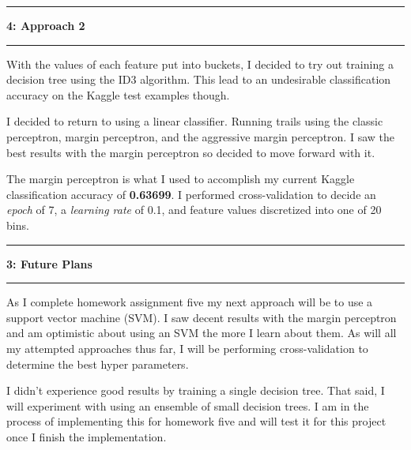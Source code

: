 \documentclass[11pt]{article}
\newcommand\question[2]{\vspace{.25in}\hrule\textbf{#1: #2}\vspace{.5em}\hrule\vspace{.10in}}
\begin{document}
\question{4}{Approach 2}

With the values of each feature put into buckets, I decided to try out training a decision tree using the ID3 algorithm. This lead to an undesirable classification accuracy on the Kaggle test examples though.

I decided to return to using a linear classifier. Running trails using the classic perceptron, margin perceptron, and the aggressive margin perceptron. I saw the best results with the margin perceptron so decided to move forward with it.

The margin perceptron is what I used to accomplish my current Kaggle classification accuracy of \textbf{0.63699}. I performed cross-validation to decide an \textit{epoch} of 7, a \textit{learning rate} of 0.1, and feature values discretized into one of 20 bins.

\question{3}{Future Plans}

As I complete homework assignment five my next approach will be to use a support vector machine (SVM). I saw decent results with the margin perceptron and am optimistic about using an SVM the more I learn about them. As will all my attempted approaches thus far, I will be performing cross-validation to determine the best hyper parameters. 

I didn't experience good results by training a single decision tree. That said, I will experiment with using an ensemble of small decision trees. I am in the process of implementing this for homework five and will test it for this project once I finish the implementation.
\end{document}
